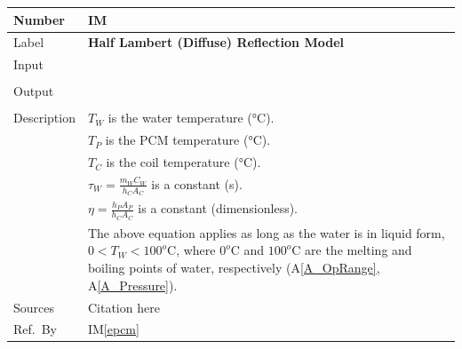 \documentclass[12pt]{article}
\newcommand{\colAwidth}{0.13\textwidth}
\newcommand{\colBwidth}{0.82\textwidth}
\newcommand{\aref}[1]{A\ref{#1}}
\newcounter{instnum} %
\newcommand{\iref}[1]{IM\ref{#1}}
\begin{document}
\noindent
\begin{minipage}{\textwidth}
	\renewcommand*{\arraystretch}{1.5}
	\begin{tabular}{| p{\colAwidth} | p{\colBwidth}|}
		\hline
		\rowcolor[gray]{0.9}
		Number& IM{instnum}\theinstnum \label{ewat}\\
		\hline
		Label& \bf Half Lambert (Diffuse) Reflection Model\\
		\hline
		Input& \\
		& \\
		\hline
		Output& \\
		& \\
		\hline
		Description&$T_W$ is the water temperature (\si{\celsius}).\\
		&$T_P$ is the PCM temperature (\si{\celsius}).\\
		&$T_C$ is the coil temperature (\si{\celsius}).\\
		&$\tau_W = \frac{m_W C_W}{h_C A_C}$ is a constant (\si{\second}).\\
		&$\eta = \frac{h_P A_P}{h_C A_C}$ is a constant (dimensionless).\\
		& The above equation applies as long as the water is in liquid form,
		$0<T_W<100^o\text{C}$, where $0^o\text{C}$ and $100^o\text{C}$ are the 
		melting
		and boiling points of water, respectively (\aref{A_OpRange}, 
		\aref{A_Pressure}).
		\\
		\hline
		Sources& Citation here \\
		\hline
		Ref.\ By & \iref{epcm}\\
		\hline
	\end{tabular}
\end{minipage}\\

~\newline
\end{document}
